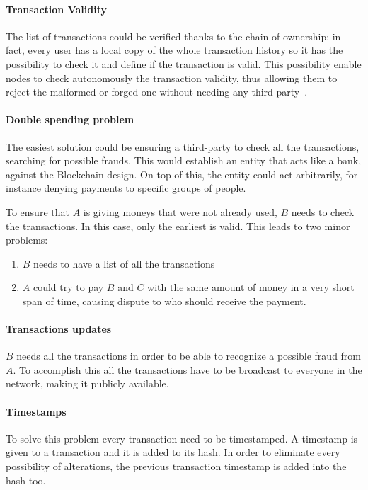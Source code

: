 \paragraph*{Transaction Validity}
The list of transactions could be verified thanks to the chain of ownership:
in fact, every user has a local copy of the whole transaction history so it has
the possibility to check it and define if the transaction is valid.
This possibility enable nodes to check autonomously the transaction validity,
thus allowing them to reject the malformed or forged one without needing any
third-party~\cite{nakamoto08}.

\paragraph*{Double spending problem}
The easiest solution could be ensuring a third-party to check all the
transactions, searching for possible frauds. This would establish an entity
that acts like a bank, against the Blockchain design. On top of this,
the entity could act arbitrarily, for instance denying payments to specific
groups of people.

To ensure that $A$ is giving moneys that were not already used, $B$ needs to
check the transactions. In this case, only the earliest is
valid\cite{nakamoto08}. This leads to two minor problems:
\begin{enumerate}
 \item $B$ needs to have a list of all the transactions
 \item $A$ could try to pay $B$ and $C$ with the same amount of money in a very
short span of time, causing dispute to who should receive the payment.
\end{enumerate}

\paragraph*{Transactions updates}
\label{TU}
$B$ needs all the transactions in order to be able to recognize a possible
fraud from $A$. To accomplish this all the transactions have to be broadcast to
everyone in the network, making it publicly available.

\paragraph*{Timestamps}
To solve this problem every transaction need to be timestamped. A timestamp is
given to a transaction and it is added to its hash. In order to eliminate every
possibility of alterations, the previous transaction timestamp is added into
the hash too\cite{nakamoto08}.

